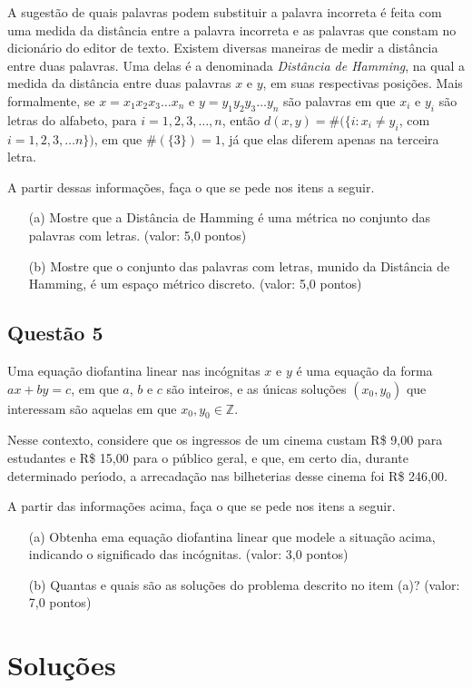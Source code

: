 A sugest\~ao de quais palavras podem substituir a palavra incorreta \'e feita com uma medida da dist\^ancia entre a palavra incorreta e as palavras que constam no dicion\'ario do editor de texto. Existem diversas maneiras de medir a dist\^ancia entre duas palavras. Uma delas \'e a denominada {\it Dist\^ancia de Hamming}, na qual a medida da dist\^ancia entre duas palavras $x$ e $y$, em suas respectivas posi\c c\~oes. Mais formalmente, se $x=x_1x_2x_3\ldots x_n$ e $y=y_1y_2y_3\ldots y_n$ s\~ao palavras em que $x_i$ e $y_i$ s\~ao letras do alfabeto, para $i=1,2,3,\ldots,n$, ent\~ao $d(x,y)=\#(\{i:x_i\neq y_i$, com $i=1,2,3,\ldots n\})$, em que $\#(\{3\})=1$, j\'a que elas diferem apenas na terceira letra.

A partir dessas informa\c c\~oes, fa\c ca o que se pede nos itens a seguir.

\begin{enumerate}

\item[(a)] Mostre que a Dist\^ancia de Hamming \'e uma m\'etrica no conjunto das palavras com letras. (valor: 5,0 pontos)

\item[(b)] Mostre que o conjunto das palavras com letras, munido da Dist\^ancia de Hamming, \'e um espa\c co m\'etrico discreto. (valor: 5,0 pontos)

\end{enumerate}

\subsection{\color{blue} Quest\~ao 5}

Uma equa\c c\~ao diofantina linear nas inc\'ognitas $x$ e $y$ \'e uma equa\c c\~ao da forma $ax+by=c$, em que $a$, $b$ e $c$ s\~ao inteiros, e as \'unicas solu\c c\~oes $(x_0,y_0)$ que interessam s\~ao aquelas em que $x_0, y_0 \in \mathbb Z$.

Nesse contexto, considere que os ingressos de um cinema custam R\$ 9,00 para estudantes e R\$ 15,00 para o p\'ublico geral, e que, em certo dia, durante determinado per\'\i odo, a arrecada\c c\~ao nas bilheterias desse cinema foi R\$ 246,00.

A partir das informa\c c\~oes acima, fa\c ca o que se pede nos itens a seguir.

\begin{enumerate}

\item[(a)] Obtenha ema equa\c c\~ao diofantina linear que modele a situa\c c\~ao acima, indicando o significado das inc\'ognitas. (valor: 3,0 pontos)

\item[(b)] Quantas e quais s\~ao as solu\c c\~oes do problema descrito no item (a)? (valor: 7,0 pontos)

\end{enumerate}

\section{\color{red} Solu\c c\~oes}

